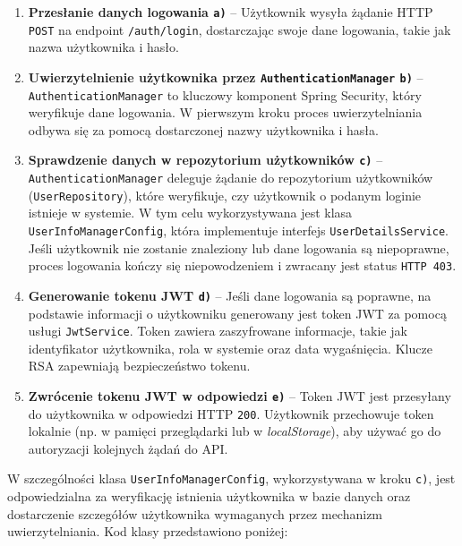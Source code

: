 \begin{enumerate}
    \item \textbf{Przesłanie danych logowania \texttt{a)}} -- Użytkownik wysyła żądanie HTTP \texttt{POST} na endpoint \texttt{/auth/login}, dostarczając swoje dane logowania, takie jak nazwa użytkownika i hasło. 
		
    \item \textbf{Uwierzytelnienie użytkownika przez \texttt{AuthenticationManager} \texttt{b)}} -- \texttt{AuthenticationManager} to kluczowy komponent Spring Security, który weryfikuje dane logowania. W pierwszym kroku proces uwierzytelniania odbywa się za pomocą dostarczonej nazwy użytkownika i hasła.

    \item \textbf{Sprawdzenie danych w repozytorium użytkowników \texttt{c)}} -- \texttt{AuthenticationManager} deleguje żądanie do repozytorium użytkowników (\texttt{UserRepository}), które weryfikuje, czy użytkownik o podanym loginie istnieje w systemie. W tym celu wykorzystywana jest klasa \texttt{UserInfoManagerConfig}, która implementuje interfejs \texttt{UserDetailsService}. Jeśli użytkownik nie zostanie znaleziony lub dane logowania są niepoprawne, proces logowania kończy się niepowodzeniem i zwracany jest status \texttt{HTTP 403}.

    \item \textbf{Generowanie tokenu JWT \texttt{d)}} -- Jeśli dane logowania są poprawne, na podstawie informacji o użytkowniku generowany jest token JWT za pomocą usługi \texttt{JwtService}. Token zawiera zaszyfrowane informacje, takie jak identyfikator użytkownika, rola w systemie oraz data wygaśnięcia. Klucze RSA zapewniają bezpieczeństwo tokenu.

    \item \textbf{Zwrócenie tokenu JWT w odpowiedzi \texttt{e)}} -- Token JWT jest przesyłany do użytkownika w odpowiedzi HTTP \texttt{200}. Użytkownik przechowuje token lokalnie (np. w pamięci przeglądarki lub w \emph{localStorage}), aby używać go do autoryzacji kolejnych żądań do API.
\end{enumerate}

W szczególności klasa \texttt{UserInfoManagerConfig}, wykorzystywana w kroku \texttt{c)}, jest odpowiedzialna za weryfikację istnienia użytkownika w bazie danych oraz dostarczenie szczegółów użytkownika wymaganych przez mechanizm uwierzytelniania. Kod klasy przedstawiono poniżej:

